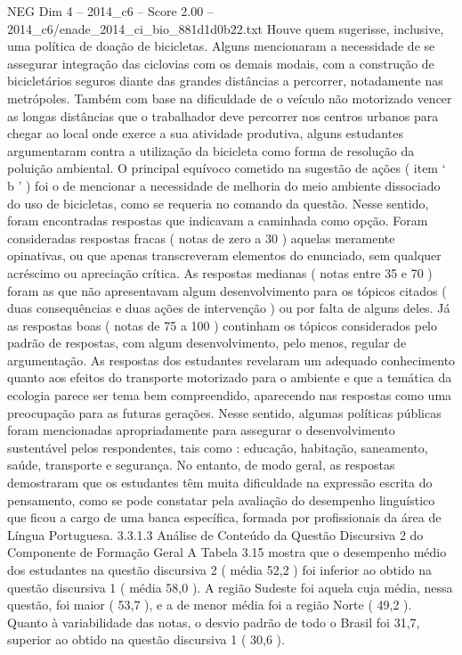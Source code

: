 \begin{textsample}{NEG Dim 4 – 2014\_c6 – Score 2.00 – 2014\_c6/enade\_2014\_ci\_bio\_881d1d0b22.txt}
Houve quem sugerisse, inclusive, uma política de doação de bicicletas.
Alguns mencionaram a necessidade de se assegurar integração das ciclovias com os demais modais, com a construção de bicicletários seguros diante das grandes distâncias a percorrer, notadamente nas metrópoles.
Também com base na dificuldade de o veículo não motorizado vencer as longas distâncias que o trabalhador deve percorrer nos centros urbanos para chegar ao local onde exerce a sua atividade produtiva, alguns estudantes argumentaram contra a utilização da bicicleta como forma de resolução da poluição ambiental.
O principal equívoco cometido na sugestão de ações ( item ‘ b ’ ) foi o de mencionar a necessidade de melhoria do meio ambiente dissociado do uso de bicicletas, como se requeria no comando da questão.
Nesse sentido, foram encontradas respostas que indicavam a caminhada como opção.
Foram consideradas respostas fracas ( notas de zero a 30 ) aquelas meramente opinativas, ou que apenas transcreveram elementos do enunciado, sem qualquer acréscimo ou apreciação crítica.
As respostas medianas ( notas entre 35 e 70 ) foram as que não apresentavam algum desenvolvimento para os tópicos citados ( duas consequências e duas ações de intervenção ) ou por falta de alguns deles.
Já as respostas boas ( notas de 75 a 100 ) continham os tópicos considerados pelo padrão de respostas, com algum desenvolvimento, pelo menos, regular de argumentação.
As respostas dos estudantes revelaram um adequado conhecimento quanto aos efeitos do transporte motorizado para o ambiente e que a temática da ecologia parece ser tema bem compreendido, aparecendo nas respostas como uma preocupação para as futuras gerações.
Nesse sentido, algumas políticas públicas foram mencionadas apropriadamente para assegurar o desenvolvimento sustentável pelos respondentes, tais como : educação, habitação, saneamento, saúde, transporte e segurança.
No entanto, de modo geral, as respostas demostraram que os estudantes têm muita dificuldade na expressão escrita do pensamento, como se pode constatar pela avaliação do desempenho linguístico que ficou a cargo de uma banca específica, formada por profissionais da área de Língua Portuguesa. 3.3.1.3 Análise de Conteúdo da Questão Discursiva 2 do Componente de Formação Geral A Tabela 3.15 mostra que o desempenho médio dos estudantes na questão discursiva 2 ( média 52,2 ) foi inferior ao obtido na questão discursiva 1 ( média 58,0 ).
A região Sudeste foi aquela cuja média, nessa questão, foi maior ( 53,7 ), e a de menor média foi a região Norte ( 49,2 ).
Quanto à variabilidade das notas, o desvio padrão de todo o Brasil foi 31,7, superior ao obtido na questão discursiva 1 ( 30,6 ).

\end{textsample}
